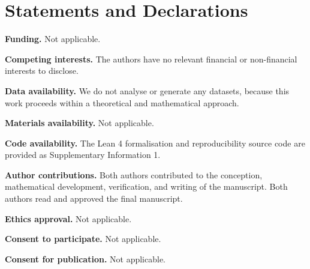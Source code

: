 \documentclass[pdflatex,sn-mathphys-num]{sn-jnl}
\theoremstyle{thmstyleone}
\begin{document}
\section*{Statements and Declarations}

\noindent\textbf{Funding.}
Not applicable.

\noindent\textbf{Competing interests.}
The authors have no relevant financial or non-financial interests to disclose.

\noindent\textbf{Data availability.}
We do not analyse or generate any datasets, because this work proceeds within
a theoretical and mathematical approach.

\noindent\textbf{Materials availability.}
Not applicable.

\noindent\textbf{Code availability.}
The Lean 4 formalisation and reproducibility source code are provided as
Supplementary Information 1.

\noindent\textbf{Author contributions.}
Both authors contributed to the conception, mathematical development,
verification, and writing of the manuscript.  Both authors read and approved
the final manuscript.

\noindent\textbf{Ethics approval.}
Not applicable.

\noindent\textbf{Consent to participate.}
Not applicable.

\noindent\textbf{Consent for publication.}
Not applicable.


\end{document}
